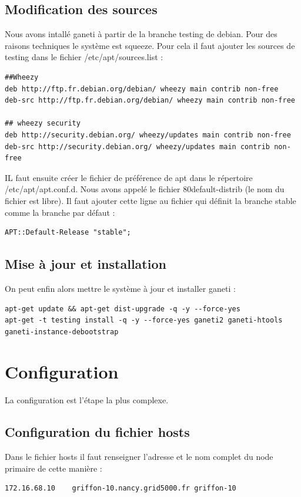 \subsection {Modification des sources}
Nous avons intallé ganeti à partir de la branche testing de debian. Pour des raisons techniques le système est squeeze. Pour cela il faut ajouter les sources de testing dans le fichier /etc/apt/sources.list :
\begin{lstlisting}
##Wheezy
deb http://ftp.fr.debian.org/debian/ wheezy main contrib non-free
deb-src http://ftp.fr.debian.org/debian/ wheezy main contrib non-free

## wheezy security
deb http://security.debian.org/ wheezy/updates main contrib non-free
deb-src http://security.debian.org/ wheezy/updates main contrib non-free
\end{lstlisting}

IL faut ensuite créer le fichier de préférence de apt dans le répertoire /etc/apt/apt.conf.d. Nous avons appelé le fichier 80default-distrib (le nom du fichier est libre). Il faut ajouter cette ligne au fichier qui définit la branche stable comme la branche par défaut :
\begin{lstlisting}
APT::Default-Release "stable";
\end{lstlisting}

\subsection {Mise à jour et installation}
On peut enfin alors mettre le système à jour et installer ganeti :

\begin{lstlisting}
apt-get update && apt-get dist-upgrade -q -y --force-yes
apt-get -t testing install -q -y --force-yes ganeti2 ganeti-htools ganeti-instance-debootstrap
\end{lstlisting}

\section {Configuration}

La configuration est l'étape la plus complexe.

\subsection {Configuration du fichier hosts}

Dans le fichier hosts il faut renseigner l'adresse et le nom complet du node primaire de cette manière :
\begin{lstlisting}
172.16.68.10    griffon-10.nancy.grid5000.fr griffon-10
\end{lstlisting}
